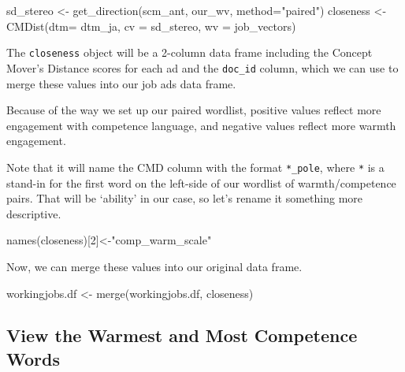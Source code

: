 \documentclass[
  letterpaper,
  DIV=11,
  numbers=noendperiod]{scrreprt}
\newenvironment{Shaded}{\begin{snugshade}}{\end{snugshade}}
\newcommand{\AttributeTok}[1]{\textcolor[rgb]{0.40,0.45,0.13}{#1}}
\newcommand{\DecValTok}[1]{\textcolor[rgb]{0.68,0.00,0.00}{#1}}
\newcommand{\FunctionTok}[1]{\textcolor[rgb]{0.28,0.35,0.67}{#1}}
\newcommand{\NormalTok}[1]{\textcolor[rgb]{0.00,0.23,0.31}{#1}}
\newcommand{\OtherTok}[1]{\textcolor[rgb]{0.00,0.23,0.31}{#1}}
\newcommand{\StringTok}[1]{\textcolor[rgb]{0.13,0.47,0.30}{#1}}
\begin{document}
\begin{Shaded}
\begin{Highlighting}[]
\NormalTok{sd\_stereo }\OtherTok{\textless{}{-}} \FunctionTok{get\_direction}\NormalTok{(scm\_ant, our\_wv, }\AttributeTok{method=}\StringTok{"paired"}\NormalTok{)}
\NormalTok{closeness }\OtherTok{\textless{}{-}} \FunctionTok{CMDist}\NormalTok{(}\AttributeTok{dtm=}\NormalTok{ dtm\_ja, }\AttributeTok{cv =}\NormalTok{ sd\_stereo, }\AttributeTok{wv =}\NormalTok{ job\_vectors)}
\end{Highlighting}
\end{Shaded}

The \texttt{closeness} object will be a 2-column data frame including
the Concept Mover's Distance scores for each ad and the \texttt{doc\_id}
column, which we can use to merge these values into our job ads data
frame.

Because of the way we set up our paired wordlist, positive values
reflect more engagement with competence language, and negative values
reflect more warmth engagement.

Note that it will name the CMD column with the format \texttt{*\_pole},
where \texttt{*} is a stand-in for the first word on the left-side of
our wordlist of warmth/competence pairs. That will be `ability' in our
case, so let's rename it something more descriptive.

\begin{Shaded}
\begin{Highlighting}[]
\FunctionTok{names}\NormalTok{(closeness)[}\DecValTok{2}\NormalTok{]}\OtherTok{\textless{}{-}}\StringTok{"comp\_warm\_scale"}
\end{Highlighting}
\end{Shaded}

Now, we can merge these values into our original data frame.

\begin{Shaded}
\begin{Highlighting}[]
\NormalTok{workingjobs.df }\OtherTok{\textless{}{-}} \FunctionTok{merge}\NormalTok{(workingjobs.df, closeness)}
\end{Highlighting}
\end{Shaded}

\subsection{View the Warmest and Most Competence
Words}\label{view-the-warmest-and-most-competence-words}
\end{document}
